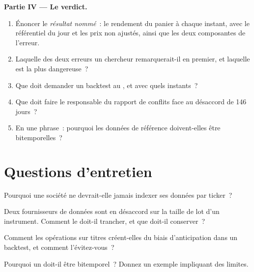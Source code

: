 \begin{problem}
\medskip\noindent\textbf{Partie IV --- Le verdict.}
\begin{enumerate}[resume]
\item Énoncer le \emph{résultat nommé}~: le rendement du panier à chaque instant, avec le référentiel du jour et les prix non ajustés, ainsi que les
deux composantes de l'erreur.
\item Laquelle des deux erreurs un chercheur remarquerait-il en premier, et laquelle est la plus dangereuse~?
\item Que doit demander un backtest au , et avec quels instants~?
\item Que doit faire le responsable du rapport de conflits face au désaccord de 146 jours~?
\item En une phrase~: pourquoi les données de référence doivent-elles être bitemporelles~?
\end{enumerate}
\end{problem}

\section{Questions d'entretien}

\begin{interviewq}\label{iq:pl:reference-data-and-symbology-services:1}
Pourquoi une société ne devrait-elle jamais indexer ses données par ticker~?
\end{interviewq}

\begin{interviewq}\label{iq:pl:reference-data-and-symbology-services:2}
Deux fournisseurs de données sont en désaccord sur la taille de lot d'un instrument. Comment le  doit-il trancher, et que doit-il conserver~?
\end{interviewq}

\begin{interviewq}\label{iq:pl:reference-data-and-symbology-services:3}
Comment les opérations sur titres créent-elles du biais d'anticipation dans un backtest, et comment l'évitez-vous~?
\end{interviewq}

\begin{interviewq}\label{iq:pl:reference-data-and-symbology-services:4}
Pourquoi un  doit-il être bitemporel~? Donnez un exemple impliquant des limites.
\end{interviewq}

